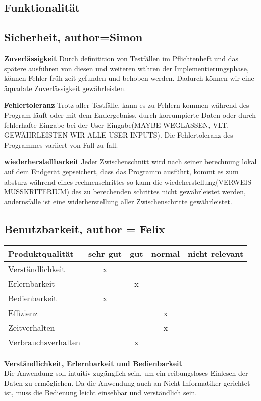 \documentclass[parskip=full]{scrartcl} %
\begin{document}
\subsection{Funktionalität}
\subsection{Sicherheit, author=Simon}

\textbf{Zuverlässigkeit}
Durch definitition von Testfällen im Pflichtenheft und das spätere ausführen von diesen und weiteren währen der Implementierungsphase, können Fehler früh zeit gefunden und behoben werden.
Dadurch können wir eine äquadate Zuverlässigkeit gewährleisten.

\textbf{Fehlertoleranz}
Trotz aller Testfälle, kann es zu Fehlern kommen während des Program läuft oder mit dem Endergebniss, durch korrumpierte Daten oder durch fehlerhafte Eingabe bei der User Eingabe(MAYBE WEGLASSEN, VLT. GEWÄHRLEISTEN WIR ALLE USER INPUTS).
Die Fehlertoleranz des Programmes variiert von Fall zu fall.

\textbf{wiederherstellbarkeit}
Jeder Zwischenschnitt wird nach seiner berechnung lokal auf dem Endgerät gepseichert, dass das Programm ausführt, kommt es zum absturz während eines rechnenschrittes so kann die wiedeherstellung(VERWEIS MUSSKRITERIUM) des zu berechenden schrittes nicht gewährleistet werden, andernsfalle ist  eine widerherstellung aller Zwischenschritte gewährleistet.


\subsection{Benutzbarkeit, author = Felix}
    \begin{tabular}{|l| c| c| c| c|}
    \hline
        Produktqualität & sehr gut & gut & normal & nicht relevant \\
    \hline
        Verständlichkeit & x & & &\\
    \hline
        Erlernbarkeit & & x & &\\
    \hline
        Bedienbarkeit & x & & &\\
    \hline
        Effizienz & & & x &\\
    \hline
        Zeitverhalten & & & x &\\
    \hline
        Verbrauchsverhalten & & x & &\\
    \hline
    \end{tabular}

\textbf{Verständlichkeit, Erlernbarkeit und Bedienbarkeit}\\
Die Anwendung soll intuitiv zugänglich sein, um ein reibungsloses Einlesen der Daten zu ermöglichen. Da die Anwendung auch an Nicht-Informatiker gerichtet ist, muss die Bedienung leicht einsehbar und verständlich sein.
\end{document}
